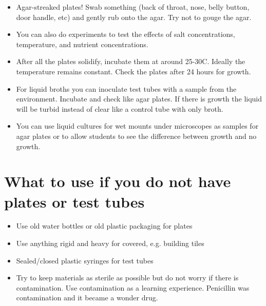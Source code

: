 \begin{itemize}

\item{Agar-streaked plates! Swab something (back of throat, nose, belly button, door handle, etc) and gently rub onto the agar. Try not to gouge the agar.}

\item{You can also do experiments to test the effects of salt concentrations, temperature, and nutrient concentrations.}

\item{After all the plates solidify, incubate them at around 25-30C. Ideally the temperature remains constant. Check the plates after 24 hours for growth.}

\item{For liquid broths you can inoculate test tubes with a sample from the environment. Incubate and check like agar plates. If there is growth the liquid will be turbid instead of clear like a control tube with only broth.}

\item{You can use liquid cultures for wet mounts under microscopes as samples for agar plates or to allow students to see the difference between growth and no growth.}

\end{itemize}

\section{What to use if you do not have plates or test tubes}

\begin{itemize}

\item{Use old water bottles or old plastic packaging for plates}

\item{Use anything rigid and heavy for covered, e.g. building tiles}

\item{Sealed/closed plastic syringes for test tubes}

\item{Try to keep materials as sterile as possible but do not worry if there is contamination. Use contamination as a learning experience. Penicillin was contamination and it became a wonder drug.}

\end{itemize}

